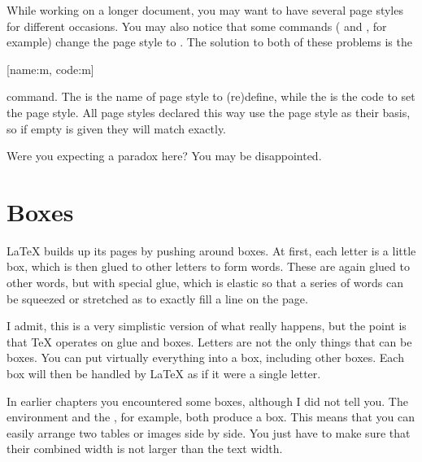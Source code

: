 While working on a longer document, you may want to have several page styles for
different occasions. You may also notice that some commands ( and
, for example) change the page style to .
The solution to both of these problems is the
\begin{lscommand}
  [name:m, code:m]
\end{lscommand}
command. The  is the name of page style to (re)define, while the %
 is the code to set the page style. All page styles declared this
way use the  page style as their basis, so if empty  is
given they will match  exactly.
\begin{example}[standalone, paperheight=3cm]
\geometry{includehead, includefoot, headsep=.5em, footskip=1em} %
\sloppy %
\usepackage{fancyhdr}%
\usepackage{extramarks}%
\pagestyle{mine}

Were you expecting a paradox here?
\noindent
You may be disappointed.

\end{example}

\section{Boxes}\label{sec:boxes}
\LaTeX{} builds up its pages by pushing around boxes. At first, each
letter is a little box, which is then glued to other letters to form
words. These are again glued to other words, but with special glue,
which is elastic so that a series of words can be squeezed or
stretched as to exactly fill a line on the page.

I admit, this is a very simplistic version of what really happens, but the
point is that \TeX{} operates on glue and boxes. Letters are not the only
things that can be boxes. You can put virtually everything into a box,
including other boxes. Each box will then be handled by \LaTeX{} as if it
were a single letter.

In earlier chapters you encountered some boxes, although I did
not tell you. The  environment and the , for
example, both produce a box. This means that you can easily arrange two
tables or images side by side. You just have to make sure that their
combined width is not larger than the text width.

